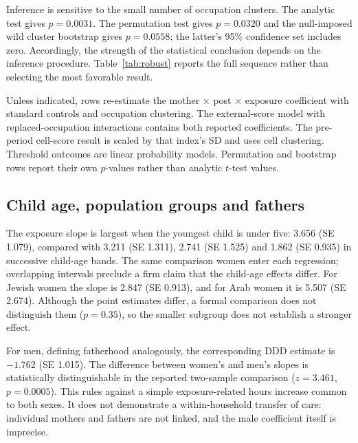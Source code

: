 \documentclass[12pt,a4paper]{article}
\begin{document}
Inference is sensitive to the small number of occupation clusters. The analytic test gives $p=0.0031$. The permutation test gives $p=0.0320$ and the null-imposed wild cluster bootstrap gives $p=0.0558$; the latter's 95\% confidence set includes zero. Accordingly, the strength of the statistical conclusion depends on the inference procedure. Table~\ref{tab:robust} reports the full sequence rather than selecting the most favorable result.

\begin{table}[htbp]\centering\begin{threeparttable}
\caption{Sensitivity of the hours triple interaction}\label{tab:robust}
\renewcommand{\baselinestretch}{1}\scriptsize\setlength{\tabcolsep}{2pt}

\begin{tablenotes}\footnotesize\item Unless indicated, rows re-estimate the mother $\times$ post $\times$ exposure coefficient with standard controls and occupation clustering. The external-score model with replaced-occupation interactions contains both reported coefficients. The pre-period cell-score result is scaled by that index's SD and uses cell clustering. Threshold outcomes are linear probability models. Permutation and bootstrap rows report their own $p$-values rather than analytic $t$-test values.\end{tablenotes}
\end{threeparttable}\end{table}

\subsection{Child age, population groups and fathers}\label{sec:heterogeneity}
The exposure slope is largest when the youngest child is under five: 3.656 (SE 1.079), compared with 3.211 (SE 1.311), 2.741 (SE 1.525) and 1.862 (SE 0.935) in successive child-age bands. The same comparison women enter each regression; overlapping intervals preclude a firm claim that the child-age effects differ. For Jewish women the slope is 2.847 (SE 0.913), and for Arab women it is 5.507 (SE 2.674). Although the point estimates differ, a formal comparison does not distinguish them ($p=0.35$), so the smaller subgroup does not establish a stronger effect.

For men, defining fatherhood analogously, the corresponding DDD estimate is $-1.762$ (SE 1.015). The difference between women's and men's slopes is statistically distinguishable in the reported two-sample comparison ($z=3.461$, $p=0.0005$). This rules against a simple exposure-related hours increase common to both sexes. It does not demonstrate a within-household transfer of care: individual mothers and fathers are not linked, and the male coefficient itself is imprecise.
\end{document}
